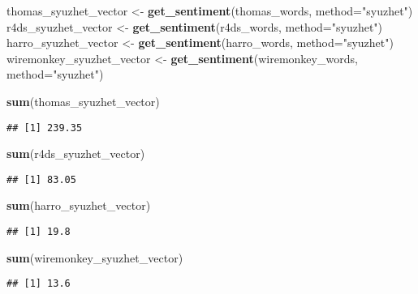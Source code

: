 \documentclass[]{article}
\newenvironment{Shaded}{\begin{snugshade}}{\end{snugshade}}
\newcommand{\DataTypeTok}[1]{\textcolor[rgb]{0.13,0.29,0.53}{#1}}
\newcommand{\KeywordTok}[1]{\textcolor[rgb]{0.13,0.29,0.53}{\textbf{#1}}}
\newcommand{\NormalTok}[1]{#1}
\newcommand{\StringTok}[1]{\textcolor[rgb]{0.31,0.60,0.02}{#1}}
\begin{document}
\begin{Shaded}
\begin{Highlighting}[]
\NormalTok{thomas_syuzhet_vector <-}\StringTok{ }\KeywordTok{get_sentiment}\NormalTok{(thomas_words, }\DataTypeTok{method=}\StringTok{"syuzhet"}\NormalTok{)}
\NormalTok{r4ds_syuzhet_vector <-}\StringTok{ }\KeywordTok{get_sentiment}\NormalTok{(r4ds_words, }\DataTypeTok{method=}\StringTok{"syuzhet"}\NormalTok{)}
\NormalTok{harro_syuzhet_vector <-}\StringTok{ }\KeywordTok{get_sentiment}\NormalTok{(harro_words, }\DataTypeTok{method=}\StringTok{"syuzhet"}\NormalTok{)}
\NormalTok{wiremonkey_syuzhet_vector <-}\StringTok{ }\KeywordTok{get_sentiment}\NormalTok{(wiremonkey_words, }\DataTypeTok{method=}\StringTok{"syuzhet"}\NormalTok{)}

\KeywordTok{sum}\NormalTok{(thomas_syuzhet_vector) }
\end{Highlighting}
\end{Shaded}

\begin{verbatim}
## [1] 239.35
\end{verbatim}

\begin{Shaded}
\begin{Highlighting}[]
\KeywordTok{sum}\NormalTok{(r4ds_syuzhet_vector) }
\end{Highlighting}
\end{Shaded}

\begin{verbatim}
## [1] 83.05
\end{verbatim}

\begin{Shaded}
\begin{Highlighting}[]
\KeywordTok{sum}\NormalTok{(harro_syuzhet_vector) }
\end{Highlighting}
\end{Shaded}

\begin{verbatim}
## [1] 19.8
\end{verbatim}

\begin{Shaded}
\begin{Highlighting}[]
\KeywordTok{sum}\NormalTok{(wiremonkey_syuzhet_vector) }
\end{Highlighting}
\end{Shaded}

\begin{verbatim}
## [1] 13.6
\end{verbatim}
\end{document}
